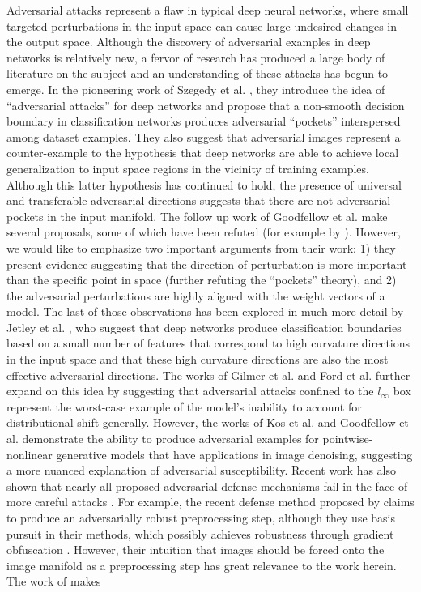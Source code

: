 Adversarial attacks represent a flaw in typical deep neural networks, where small targeted perturbations in the input space can cause large undesired changes in the output space. Although the discovery of adversarial examples in deep networks is relatively new, a fervor of research has produced a large body of literature on the subject and an understanding of these attacks has begun to emerge. In the pioneering work of Szegedy et al. \citeyearpar{szegedy2013intriguing}, they introduce the idea of ``adversarial attacks'' for deep networks and propose that a non-smooth decision boundary in classification networks produces adversarial ``pockets'' interspersed among dataset examples. They also suggest that adversarial images represent a counter-example to the hypothesis that deep networks are able to achieve local generalization to input space regions in the vicinity of training examples. Although this latter hypothesis has continued to hold, the presence of universal and transferable adversarial directions \parencite{moosavi2017universal} suggests that there are not adversarial pockets in the input manifold. The follow up work of Goodfellow et al. \citeyearpar{goodfellow2014explaining} make several proposals, some of which have been refuted (for example by \cite{jetley2018friends}). However, we would like to emphasize two important arguments from their work: 1) they present evidence suggesting that the direction of perturbation is more important than the specific point in space (further refuting the ``pockets'' theory), and 2) the adversarial perturbations are highly aligned with the weight vectors of a model. The last of those observations has been explored in much more detail by Jetley et al. \citeyearpar{jetley2018friends}, who suggest that deep networks produce classification boundaries based on a small number of features that correspond to high curvature directions in the input space and that these high curvature directions are also the most effective adversarial directions. The works of Gilmer et al. \citeyearpar{gilmer2018adversarial} and Ford et al. \citeyearpar{ford2019adversarial} further expand on this idea by suggesting that adversarial attacks confined to the $l_{\infty}$ box represent the worst-case example of the model's inability to account for distributional shift generally. However, the works of Kos et al. \citeyearpar{kos2018adversarial} and Goodfellow et al. \citeyearpar{goodfellow2014explaining} demonstrate the ability to produce adversarial examples for pointwise-nonlinear generative models that have applications in image denoising, suggesting a more nuanced explanation of adversarial susceptibility. Recent work has also shown that nearly all proposed adversarial defense mechanisms fail in the face of more careful attacks \parencite{carlini2017towards, athalye2018obfuscated}. For example, the recent defense method proposed by \parencite{sun2018adversarial} claims to produce an adversarially robust preprocessing step, although they use basis pursuit in their methods, which possibly achieves robustness through gradient obfuscation \parencite{athalye2018obfuscated}. However, their intuition that images should be forced onto the image manifold as a preprocessing step has great relevance to the work herein. The work of \parencite{jacobsen2018excessive} makes 